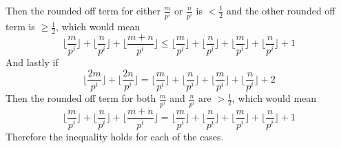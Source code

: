 \documentclass[12pt]{article}
\newenvironment{ques}{\vspace{2 ex}}{\vspace{2 ex}}
\theoremstyle{definition}
\begin{document}
\begin{ques}
		Then the rounded off term for either $\frac m {p^i}$ or $\frac
		n {p^i}$ is $< \frac 1 2$ and the other rounded off term is
		$\geq \frac 1 2$, which would mean
		$$\lfloor\frac m {p^i}\rfloor + \lfloor\frac{n}{p^i}\rfloor +
		\lfloor\frac{m+n}{p^i}\rfloor \leq \lfloor\frac{m}{p^i}\rfloor +
		\lfloor\frac{n}{p^i}\rfloor + \lfloor\frac{m}{p^i}\rfloor +
		\lfloor\frac{n}{p^i}\rfloor + 1$$
		And lastly if
		$$\lfloor\frac{2m}{p^i}\rfloor + \lfloor\frac{2n}{p^i}\rfloor
		= \lfloor\frac{m}{p^i}\rfloor + \lfloor\frac{n}{p^i}\rfloor +
		\lfloor\frac{m}{p^i}\rfloor + \lfloor\frac{n}{p^i}\rfloor + 2$$
		Then the rounded off term for both $\frac m {p^i}$ and $\frac
		n {p^i}$ are $> \frac 1 2$, which would mean
		$$\lfloor\frac m {p^i}\rfloor + \lfloor\frac{n}{p^i}\rfloor +
		\lfloor\frac{m+n}{p^i}\rfloor = \lfloor\frac{m}{p^i}\rfloor +
		\lfloor\frac{n}{p^i}\rfloor + \lfloor\frac{m}{p^i}\rfloor +
		\lfloor\frac{n}{p^i}\rfloor + 1$$
		Therefore the inequality holds for each of the cases.
\end{ques}
\end{document}

